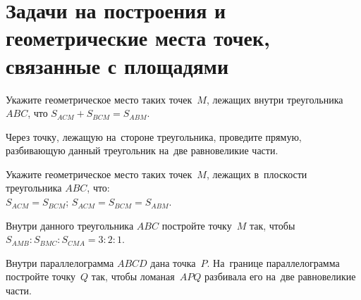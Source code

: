 


\section*{%
Задачи на построения и геометрические места точек, связанные с площадями}




\begin{problems}

\item
Укажите геометрическое место таких точек~$M$, лежащих внутри
треугольника $ABC$, что $S_{ACM} + S_{BCM} = S_{ABM}$.

\item
Через точку, лежащую на~стороне треугольника, проведите прямую, разбивающую
данный треугольник на~две равновеликие части.

\item
Укажите геометрическое место таких точек~$M$, лежащих в~плоскости
треугольника $ABC$, что:
\\
\sp $S_{ACM} = S_{BCM}$;
\quad
\sp $S_{ACM} = S_{BCM} = S_{ABM}$.

\item
Внутри данного треугольника $ABC$ постройте точку~$M$ так, чтобы
$S_{AMB} : S_{BMC} : S_{CMA} = 3 : 2 : 1$.

\item
Внутри параллелограмма $ABCD$ дана точка~$P$.
На~границе параллелограмма постройте точку~$Q$ так, чтобы ломаная~$APQ$
разбивала его на~две равновеликие части.

\end{problems}

